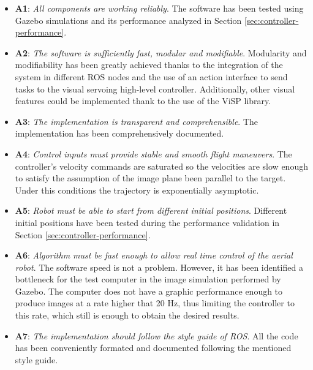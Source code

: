 \begin{itemize}
	\item \textbf{A1}: \emph{All components are working reliably}. The software has been tested using Gazebo simulations and its performance analyzed in Section \ref{sec:controller-performance}.
	
	\item \textbf{A2}: \emph{The software is sufficiently fast, modular and modifiable}. Modularity and modifiability has been greatly achieved thanks to the integration of the system in different ROS nodes and the use of an action interface to send tasks to the visual servoing high-level controller. Additionally, other visual features could be implemented thank to the use of the ViSP library.
	
	\item \textbf{A3}: \emph{The implementation is transparent and comprehensible}. The implementation has been comprehensively documented. 
	
	\item \textbf{A4}: \emph{Control inputs must provide stable and smooth flight maneuvers}. The controller's velocity commands are saturated so the velocities are slow enough to satisfy the assumption of the image plane been parallel to the target. Under this conditions the trajectory is exponentially asymptotic.
	
	\item \textbf{A5}: \emph{Robot must be able to start from different initial positions}. Different initial positions have been tested during the performance validation in Section \ref{sec:controller-performance}.
	
	\item \textbf{A6}: \emph{Algorithm must be fast enough to allow real time control of the aerial robot}. The software speed is not a problem. However, it has been identified a bottleneck for the test computer in the image simulation performed by Gazebo. The computer does not have a graphic performance enough to produce images at a rate higher that 20 Hz, thus limiting the controller to this rate, which still is enough to obtain the desired results.
	
	\item \textbf{A7}: \emph{The implementation should follow the style guide of ROS}. All the code has been conveniently formated and documented following the mentioned style guide.
\end{itemize}